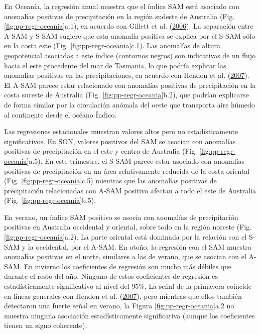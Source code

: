 \documentclass[12pt,oneside,a4paper]{reedthesis}
\begin{document}
En Oceanía, la regresión anual muestra que el índice SAM está asociado con anomalías positivas de precipitación en la región sudeste de Australia (Fig. \ref{fig:pp-regr-oceania}a.1), en acuerdo con Gillett et al. (\protect\hyperlink{ref-gillett2006}{2006}).
La separación entre A-SAM y S-SAM sugiere que esta anomalía positiva se explica por el S-SAM sólo en la costa este (Fig. \ref{fig:pp-regr-oceania}c.1).
Las anomalías de altura geopotencial asociadas a este índice (contornos negros) son indicativas de un flujo hacia el este procedente del mar de Tasmania, lo que podría explicar las anomalías positivas en las precipitaciones, en acuerdo con Hendon et al. (\protect\hyperlink{ref-hendon2007}{2007}).
El A-SAM parece estar relacionado con anomalías positivas de precipitación en la costa sureste de Australia (Fig. \ref{fig:pp-regr-oceania}b.2), que podrían explicarse de forma similar por la circulación anómala del oeste que transporta aire húmedo al continente desde el océano Índico.

Las regresiones estacionales muestran valores altos pero no estadísticamente significativos.
En SON, valores positivos del SAM se asocian con anomalías positivas de precipitación en el este y centro de Australia (Fig. \ref{fig:pp-regr-oceania}a.5).
En este trimestre, el S-SAM parece estar asociado con anomalías positivas de precipitación en un área relativamente reducida de la costa oriental (Fig. \ref{fig:pp-regr-oceania}c.5) mientras que las anomalías positivas de precipitación relacionadas con A-SAM positivo afectan a todo el este de Australia (Fig. \ref{fig:pp-regr-oceania}b.5).

En verano, un índice SAM positivo se asocia con anomalías de precipitación positivas en Australia occidental y oriental, sobre todo en la región noreste (Fig. \ref{fig:pp-regr-oceania}a.2).
La parte oriental está dominada por la relación con el S-SAM y la occidental, por el A-SAM.
En otoño, la regresión con el SAM muestra anomalías positivas en el norte, similares a las de verano, que se asocian con el A-SAM.
En invierno los coeficientes de regresión son mucho más débiles que durante el resto del año.
Ninguno de estos coeficientes de regresión es estadísticamente significativo al nivel del 95\%.
La señal de la primavera coincide en líneas generales con Hendon et al. (\protect\hyperlink{ref-hendon2007}{2007}), pero mientras que ellos también detectaron una fuerte señal en verano, la Figura \ref{fig:pp-regr-oceania}a.2 no muestra ninguna asociación estadísticamente significativa (aunque los coeficientes tienen un signo coherente).
\end{document}
